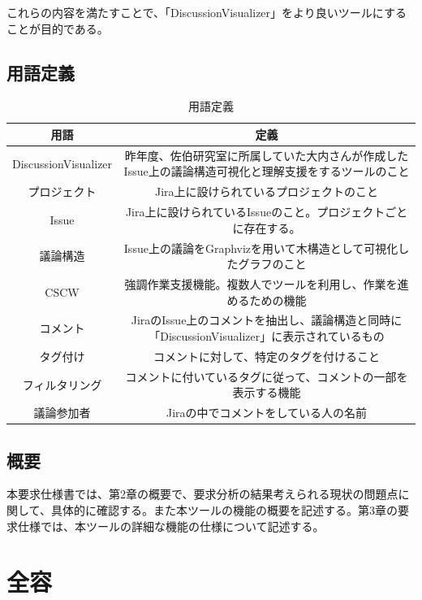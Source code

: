 \documentclass[12pt, oneside]{jreport}
\begin{document}
	これらの内容を満たすことで、「DiscussionVisualizer」をより良いツールにすることが目的である。

	\section{用語定義}
	\begin{table}[htb]
		\begin{center}
		\caption{用語定義}
  		\begin{tabular}{|c|c|} \hline
    		用語 & 定義 \\ \hline \hline
    		DiscussionVisualizer & \shortstack{昨年度、佐伯研究室に所属していた大内さんが作成した\\Issue上の議論構造可視化と理解支援をするツールのこと}  \\ \hline
		プロジェクト & Jira上に設けられているプロジェクトのこと  \\ \hline
		Issue & Jira上に設けられているIssueのこと。プロジェクトごとに存在する。  \\ \hline
    		議論構造 & Issue上の議論をGraphvizを用いて木構造として可視化したグラフのこと  \\ \hline
    		CSCW & 強調作業支援機能。複数人でツールを利用し、作業を進めるための機能  \\ \hline
    		コメント & \shortstack{JiraのIssue上のコメントを抽出し、議論構造と同時に\\「DiscussionVisualizer」に表示されているもの}  \\ \hline
		タグ付け & コメントに対して、特定のタグを付けること  \\ \hline
		フィルタリング & コメントに付いているタグに従って、コメントの一部を表示する機能  \\ \hline
    		議論参加者 & Jiraの中でコメントをしている人の名前  \\ \hline
  		\end{tabular}
  		\end{center}
	\end{table}	
	
	\newpage
	
	\section{概要}
	本要求仕様書では、第2章の概要で、要求分析の結果考えられる現状の問題点に関して、具体的に確認する。また本ツールの機能の概要を記述する。第3章の要求仕様では、本ツールの詳細な機能の仕様について記述する。
	

\chapter{全容}
\end{document}
